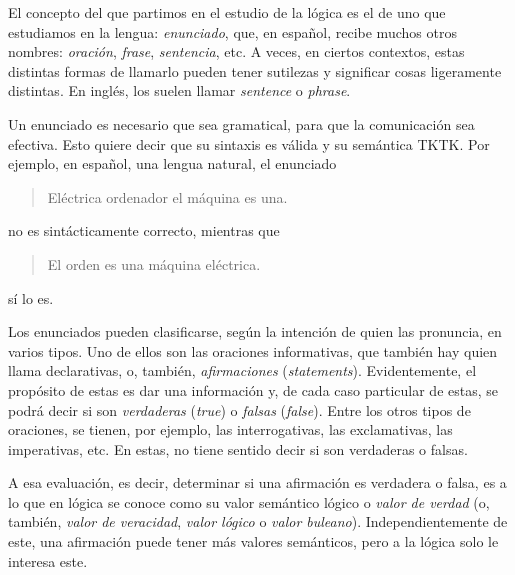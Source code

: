 

El concepto del que partimos en el estudio de la lógica es el de uno que
estudiamos en la lengua: \emph{enunciado}, que, en español, recibe muchos
otros nombres: \emph{oración}, \emph{frase}, \emph{sentencia}, etc. A veces,
en ciertos contextos, estas distintas formas de llamarlo pueden tener
sutilezas y significar cosas ligeramente distintas. En inglés, los suelen
llamar \emph{sentence} o \emph{phrase}.\footnotemark


Un enunciado es necesario que sea gramatical, para que la comunicación sea
efectiva. Esto quiere decir que su sintaxis es válida y su semántica TKTK.
Por ejemplo, en español, una lengua natural, el enunciado

\begin{quote}
  Eléctrica ordenador el máquina es una.
\end{quote}

\noindent no es sintácticamente correcto, mientras que

\begin{quote}
  El orden es una máquina eléctrica.
\end{quote}

\noindent sí lo es.

Los enunciados pueden clasificarse, según la intención de quien las
pronuncia, en varios tipos. Uno de ellos son las oraciones informativas, que
también hay quien llama declarativas, o, también, \emph{afirmaciones}
(\emph{statements}). Evidentemente, el propósito de estas es dar una
información y, de cada caso particular de estas, se podrá decir si son
\emph{verdaderas} (\emph{true}) o \emph{falsas} (\emph{false}). Entre los
otros tipos de oraciones, se tienen, por ejemplo, las interrogativas, las
exclamativas, las imperativas, etc. En estas, no tiene sentido decir si son
verdaderas o falsas.

A esa evaluación, es decir, determinar si una afirmación es verdadera o
falsa, es a lo que en lógica se conoce como su valor semántico lógico o
\emph{valor de verdad} (o, también, \emph{valor de veracidad}, \emph{valor
lógico} o \emph{valor buleano}). Independientemente de este, una afirmación
puede tener más valores semánticos, pero a la lógica solo le interesa este.

